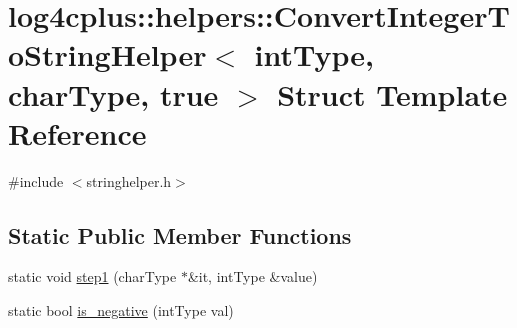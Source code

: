 \hypertarget{structlog4cplus_1_1helpers_1_1ConvertIntegerToStringHelper_3_01intType_00_01charType_00_01true_01_4}{\section{log4cplus\-:\-:helpers\-:\-:Convert\-Integer\-To\-String\-Helper$<$ int\-Type, char\-Type, true $>$ Struct Template Reference}
\label{structlog4cplus_1_1helpers_1_1ConvertIntegerToStringHelper_3_01intType_00_01charType_00_01true_01_4}
}


{\ttfamily \#include $<$stringhelper.\-h$>$}

\subsection*{Static Public Member Functions}
\begin{DoxyCompactItemize}
\item 
static void \hyperlink{structlog4cplus_1_1helpers_1_1ConvertIntegerToStringHelper_3_01intType_00_01charType_00_01true_01_4_ac57ab692bfab180a3888a93b57d6c1bd}{step1} (char\-Type $\ast$\&it, int\-Type \&value)
\item 
static bool \hyperlink{structlog4cplus_1_1helpers_1_1ConvertIntegerToStringHelper_3_01intType_00_01charType_00_01true_01_4_a2e639f5883f671c62145182fe462d3ce}{is\-\_\-negative} (int\-Type val)
\end{DoxyCompactItemize}



